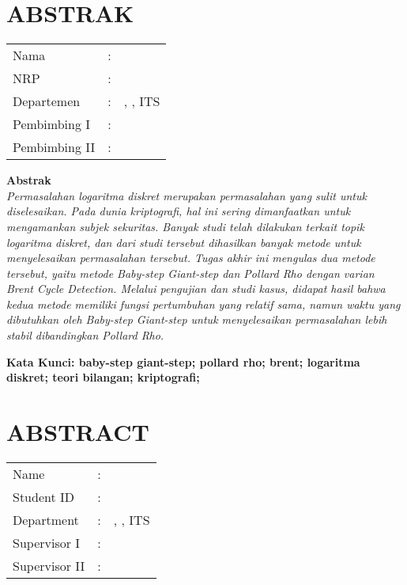 \chapter {ABSTRAK}


\noindent\textbf{\MakeUppercase\judul}
\vspace*{1em}

\begin{tabularx}{\linewidth}{ l l X }
	Nama 			& : & \penulis \\
	NRP 			& :	& \nrplama \\
	Departemen 		& : & \jurusanbaru, \newline \fakultasbaru, ITS \\
	Pembimbing I 	& : & \pembimbingsatu \\
	Pembimbing II 	& : & \pembimbingdua
	\vspace*{1em} 	%
\end {tabularx}

\noindent\textbf{Abstrak} \\
\itshape
Permasalahan logaritma diskret merupakan permasalahan yang sulit untuk diselesaikan. Pada dunia kriptografi, hal ini sering dimanfaatkan untuk mengamankan subjek sekuritas. Banyak studi telah dilakukan terkait topik logaritma diskret, dan dari studi tersebut dihasilkan banyak metode untuk menyelesaikan permasalahan tersebut. Tugas akhir ini mengulas dua metode tersebut, yaitu metode Baby-step Giant-step dan Pollard Rho dengan varian Brent Cycle Detection. Melalui pengujian dan studi kasus, didapat hasil bahwa kedua metode memiliki fungsi pertumbuhan yang relatif sama, namun waktu yang dibutuhkan oleh Baby-step Giant-step untuk menyelesaikan permasalahan lebih stabil dibandingkan Pollard Rho.

\vspace*{1em}
\noindent\bfseries Kata Kunci: baby-step giant-step; pollard rho; brent; logaritma diskret; teori bilangan; kriptografi;
\normalfont
\cleardoublepage

\chapter {ABSTRACT}
\noindent\textbf{\MakeUppercase\juduleng}
\vspace*{1em}

\begin{tabularx}{\linewidth}{ l l X }
	Name 			& : & \penulis \\
	Student ID		& :	& \nrplama \\
	Department 		& : & \jurusanbarueng, \newline \fakultasbarueng, ITS \\
	Supervisor I 	& : & \pembimbingsatu \\
	Supervisor II 	& : & \pembimbingdua
	\vspace*{1em} 	%
\end {tabularx}
	
